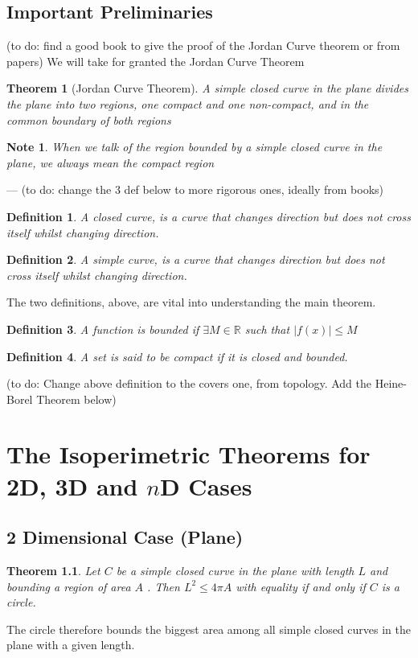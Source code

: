 \documentclass[a4paper]{book}
\newtheorem{theorem}{Theorem}%
\newtheorem*{note*}{Note}%
\newtheorem{definition}{Definition}%
\begin{document}
\section*{Important Preliminaries}
(to do: find a good book to give the proof of the Jordan Curve theorem or from papers)
We will take for granted the Jordan Curve Theorem
\begin{theorem}[Jordan Curve Theorem]
A simple closed curve in the plane divides the plane into two regions, one compact and one non-compact, and in the common boundary of both regions
\end{theorem}
\begin{note*}
When we talk of the region bounded by a simple closed curve in the plane, we always mean the compact region
\end{note*}
---
(to do: change the 3 def below to more rigorous ones, ideally from books)
\begin{definition}
A closed curve, is a curve that changes direction but does not cross itself whilst changing direction.
\end{definition}
\begin{definition}
A simple curve, is a curve that changes direction but does not cross itself whilst changing direction.
\end{definition}
The two definitions, above, are vital into understanding the main theorem.
\begin{definition}
A function is bounded if $\exists M \in \mathbb{R}$ such that $\left| f(x) \right| \leq M$
\end{definition}
\begin{definition}
A set is said to be compact if it is closed and bounded.
\end{definition}
(to do: Change above definition to the covers one, from topology. Add the Heine-Borel Theorem below)


\chapter{The Isoperimetric Theorems for 2D, 3D and $n$D Cases}
\section{2 Dimensional Case (Plane)}
\begin{theorem}
Let $C$ be a simple closed curve in the plane with length $L$ and bounding a region of area $A$ . 
Then $L^2 \leq 4\pi A$ with equality if and only if $C$ is a circle.
\end{theorem}
The circle therefore bounds the biggest area among all simple closed curves in the plane with a given length.
\end{document}

